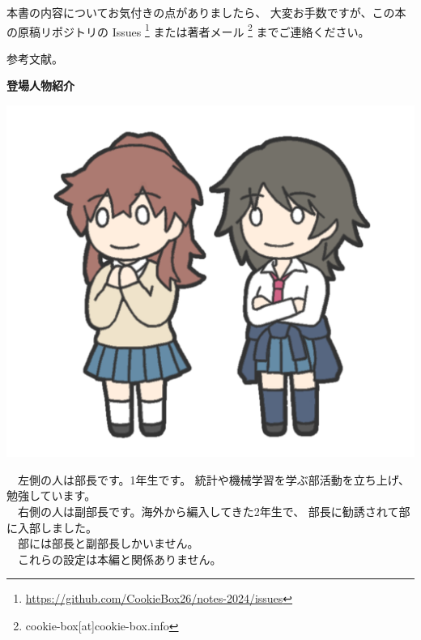 \documentclass[b5paper,xelatex,ja=standard,11pt]{bxjsarticle}
\begin{document}
本書の内容についてお気付きの点がありましたら、
大変お手数ですが、この本の原稿リポジトリの
 Issues \footnote{\url{https://github.com/CookieBox26/notes-2024/issues}}
または著者メール \footnote{cookie-box[at]cookie-box.info} までご連絡ください。

\begin{thebibliography}{9}
   参考文献。
\end{thebibliography}

\vspace{7pt}\centerline{\large\bf 登場人物紹介}
\vspace{-20pt}
\noindent
\begin{minipage}[t]{0.33\textwidth}
\centering
\strut\vspace*{-\baselineskip}
\newline\newline
\includegraphics[width=1.0\textwidth,keepaspectratio]{../images/ab.png}
\end{minipage}
\begin{minipage}[t]{0.67\textwidth}
\vspace{18pt}
　左側の人は部長です。1年生です。
統計や機械学習を学ぶ部活動を立ち上げ、勉強しています。\\
　右側の人は副部長です。海外から編入してきた2年生で、
部長に勧誘されて部に入部しました。\\
　部には部長と副部長しかいません。\\
　これらの設定は本編と関係ありません。
\end{minipage}
\end{document}
